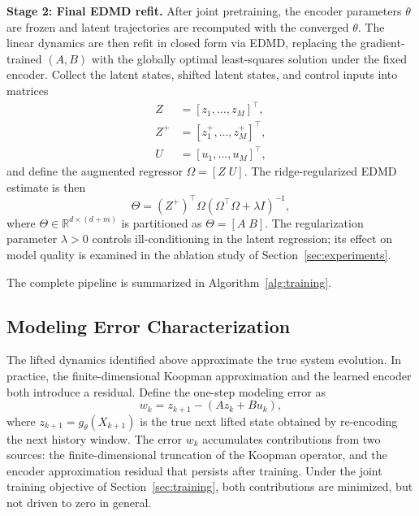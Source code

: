 \documentclass[journal]{IEEEtran}
\begin{document}
\textbf{Stage 2: Final EDMD refit.}
After joint pretraining, the encoder parameters $\theta$ are frozen and latent trajectories are recomputed with the converged $\theta$. The linear dynamics are then refit in closed form via EDMD, replacing the gradient-trained $(A,B)$ with the globally optimal least-squares solution under the fixed encoder. Collect the latent states, shifted latent states, and control inputs into matrices
\begin{align}
    Z &= [z_1,\ldots,z_M]^\top, \\
    Z^{+} &= [z_1^{+},\ldots,z_M^{+}]^\top, \\
    U &= [u_1,\ldots,u_M]^\top,
\end{align}
and define the augmented regressor $\Omega=[Z\;U]$. The ridge-regularized EDMD estimate is then
\begin{equation}
    \Theta = (Z^{+})^\top \Omega
    \left(\Omega^\top\Omega + \lambda I\right)^{-1},
    \label{eq:edmd_solution}
\end{equation}
where $\Theta \in \mathbb{R}^{d\times(d+m)}$ is partitioned as $\Theta = [A\;B]$. The regularization parameter $\lambda > 0$ controls ill-conditioning in the latent regression; its effect on model quality is examined in the ablation study of Section~\ref{sec:experiments}.

The complete pipeline is summarized in Algorithm~\ref{alg:training}.

\subsection{Modeling Error Characterization}
\label{subsec:modeling_error}

The lifted dynamics identified above approximate the true system evolution. In practice, the finite-dimensional Koopman approximation and the learned encoder both introduce a residual. Define the one-step modeling error as
\begin{equation}
    w_k = z_{k+1} - (Az_k + Bu_k),
    \label{eq:modeling_error}
\end{equation}
where $z_{k+1} = g_\theta(X_{k+1})$ is the true next lifted state obtained by re-encoding the next history window. The error $w_k$ accumulates contributions from two sources: the finite-dimensional truncation of the Koopman operator, and the encoder approximation residual that persists after training. Under the joint training objective of Section~\ref{sec:training}, both contributions are minimized, but not driven to zero in general.
\end{document}
